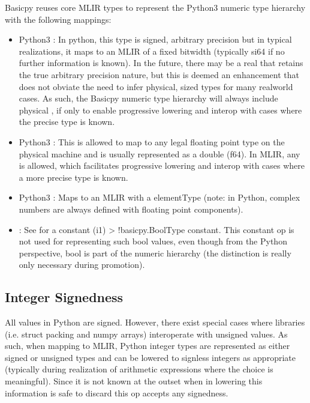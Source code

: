\documentclass[letterpaper,10pt,english]{sphinxmanual}
\begin{document}
\sphinxAtStartPar
Basicpy re\sphinxhyphen{}uses core MLIR types to represent the Python3 numeric type
hierarchy with the following mappings:
\begin{itemize}
\item {} 
\sphinxAtStartPar
Python3  : In python, this type is signed, arbitrary precision
but in typical realizations, it maps to an MLIR  of a
fixed bit\sphinxhyphen{}width (typically si64 if no further information is known).
In the future, there may be a real  that retains
the true arbitrary precision nature, but this is deemed an
enhancement that does not obviate the need to infer physical, sized
types for many real\sphinxhyphen{}world cases. As such, the Basicpy numeric type
hierarchy will always include physical , if only to
enable progressive lowering and interop with cases where the precise
type is known.

\item {} 
\sphinxAtStartPar
Python3  : This is allowed to map to any legal floating
point type on the physical machine and is usually represented as a
double (f64). In MLIR, any  is allowed, which
facilitates progressive lowering and interop with cases where a more
precise type is known.

\item {} 
\sphinxAtStartPar
Python3  : Maps to an MLIR  with a
 elementType (note: in Python, complex numbers are
always defined with floating point components).

\item {} 
\sphinxAtStartPar
{} : See  for a constant (i1) \sphinxhyphen{}\textgreater{}
!basicpy.BoolType constant. This constant op is not used for
representing such bool values, even though from the Python
perspective, bool is part of the numeric hierarchy (the distinction
is really only necessary during promotion).

\end{itemize}


\subsection{Integer Signedness}
\label{\detokenize{Basicpy/index:integer-signedness}}
\sphinxAtStartPar
All  values in Python are signed. However, there exist special
cases where libraries (i.e. struct packing and numpy arrays)
interoperate with unsigned values. As such, when mapping to MLIR, Python
integer types are represented as either signed or unsigned
 types and can be lowered to signless integers as
appropriate (typically during realization of arithmetic expressions
where the choice is meaningful). Since it is not known at the outset
when in lowering this information is safe to discard this
 op accepts any signedness.
\end{document}
